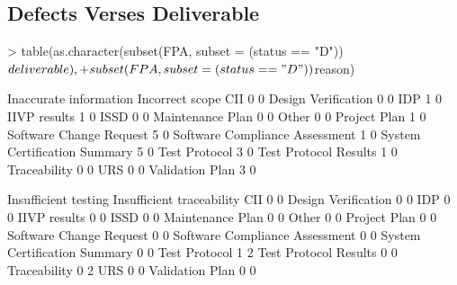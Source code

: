 \documentclass{article}
\begin{document}
\subsection{Defects Verses Deliverable}

\begin{Schunk}
\begin{Sinput}
> table(as.character(subset(FPA, subset = (status == "D"))$deliverable),
+       subset(FPA, subset = (status == "D"))$reason)
\end{Sinput}
\begin{Soutput}
                                 Inaccurate information Incorrect scope
  CII                                                 0               0
  Design Verification                                 0               0
  IDP                                                 1               0
  IIVP results                                        1               0
  ISSD                                                0               0
  Maintenance Plan                                    0               0
  Other                                               0               0
  Project Plan                                        1               0
  Software Change Request                             5               0
  Software Compliance Assessment                      1               0
  System Certification Summary                        5               0
  Test Protocol                                       3               0
  Test Protocol Results                               1               0
  Traceability                                        0               0
  URS                                                 0               0
  Validation Plan                                     3               0

                                 Insufficient testing Insufficient traceability
  CII                                               0                         0
  Design Verification                               0                         0
  IDP                                               0                         0
  IIVP results                                      0                         0
  ISSD                                              0                         0
  Maintenance Plan                                  0                         0
  Other                                             0                         0
  Project Plan                                      0                         0
  Software Change Request                           0                         0
  Software Compliance Assessment                    0                         0
  System Certification Summary                      0                         0
  Test Protocol                                     1                         2
  Test Protocol Results                             0                         0
  Traceability                                      0                         2
  URS                                               0                         0
  Validation Plan                                   0                         0


\end{Soutput}
\end{Schunk}
\end{document}
